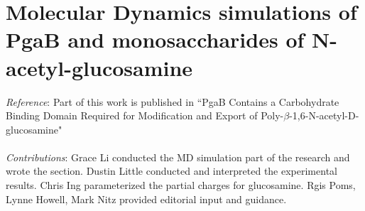 % 


\chapter[MD simulations of PgaB-glucosamine binding]{Molecular Dynamics simulations of PgaB and monosaccharides of N-acetyl-glucosamine}

\emph{Reference}: Part of this work is published in ``PgaB Contains a Carbohydrate Binding Domain Required for Modification and Export of Poly-$\beta$-1,6-N-acetyl-D-glucosamine"
\\
\\
\emph{Contributions}:
Grace Li conducted the MD simulation part of the research and wrote the section. Dustin Little conducted and interpreted the experimental results. Chris Ing parameterized the partial charges for glucosamine. Rgis Poms, Lynne Howell, Mark Nitz provided editorial input and guidance.

\newpage

